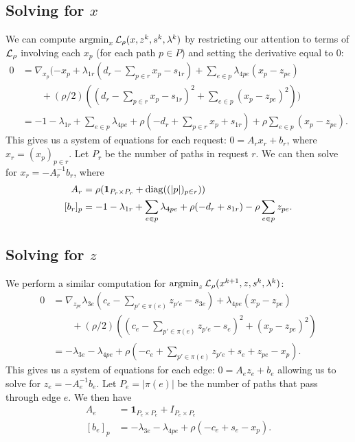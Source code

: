 \documentclass[11pt]{article}
\begin{document}
\subsection{Solving for $x$}
We can compute $\operatorname*{argmin}_{x} \mathcal{L}_\rho(x,z^k,s^k,\lambda^k)$ by restricting our
attention to terms of $\mathcal{L}_\rho$ involving each $x_p$ (for each path $p\in P$)
and setting the derivative equal to 0:
\begin{align*}
0
&= \nabla_{x_p}(-x_p + \lambda_{1r}(d_r - \sum_{p\in r}x_p - s_{1r})
    + \sum_{e\in p}\lambda_{4pe}(x_p - z_{pe})\\
    & \qquad + (\rho/2)((d_r - \sum_{p\in r}x_p - s_{1r})^2 + \sum_{e \in p}(x_p - z_{pe})^2))\\
&= -1 -\lambda_{1r} + \sum_{e \in p}\lambda_{4pe} + \rho(-d_r + \sum_{p\in r}x_p + s_{1r})
    +\rho\sum_{e \in p} (x_p - z_{pe}).
\end{align*}
This gives us a system of equations for each request: $0 = A_rx_r + b_r$,
where $x_r = (x_p)_{p\in r}$.
Let $P_r$ be the number of paths in request $r$.
We can then solve for $x_r = -A_r^{-1}b_r$,
where
\begin{align*}
A_r &= \rho(\mathbf{1}_{P_r\times P_r} + \mathrm{diag}((|p|)_{p\in r}))\\
[b_r]_p &=
    -1 -\lambda_{1r} + \sum_{e \in p}\lambda_{4pe} + \rho(-d_r + s_{1r})
    - \rho\sum_{e \in p} z_{pe}.
\end{align*}

\subsection{Solving for $z$}
We perform a similar computation for $\operatorname*{argmin}_{z} \mathcal{L}_\rho(x^{k+1},z,s^k,\lambda^k)$:
\begin{align*}
0
&= \nabla_{z_{pe}}\lambda_{3e}(c_e - \sum_{p'\in\pi(e)} z_{p'e} - s_{3e})
    + \lambda_{4pe}(x_p - z_{pe})\\
& \qquad + (\rho/2)((c_e - \sum_{p'\in\pi(e)} z_{p'e} - s_e)^2 + (x_p - z_{pe})^2)\\
&= -\lambda_{3e} - \lambda_{4pe}
    + \rho(-c_e + \sum_{p'\in\pi(e)} z_{p'e} + s_e  + z_{pe} - x_p).
\end{align*}
This gives us a system of equations for each edge: $0 = A_ez_e + b_e$
allowing us to solve for $z_e = -A_e^{-1}b_e$.
Let $P_e= |\pi(e)|$ be the number of paths that pass through edge $e$.
We then have
\begin{align*}
A_e &= \mathbf{1}_{P_e\times P_e} + I_{P_e\times P_e}\\
[b_e]_p &= -\lambda_{3e} - \lambda_{4pe}
    + \rho(-c_e + s_e - x_p).
\end{align*}
\end{document}
